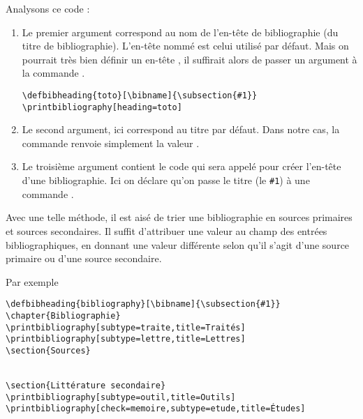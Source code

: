 Analysons ce code :
\begin{enumerate}
\item Le premier argument correspond au nom de l'en-tête de bibliographie (du titre de bibliographie). L'en-tête nommé  est celui utilisé par défaut. Mais on pourrait très bien définir un en-tête , il suffirait alors de passer un argument  à la commande .

\begin{verbatim}
\defbibheading{toto}[\bibname]{\subsection{#1}}
\printbibliography[heading=toto]
\end{verbatim}

\item Le second argument, ici  correspond au titre par défaut. Dans notre cas, la commande  renvoie simplement la valeur .
\item Le troisième argument contient le code qui sera appelé pour créer l'en-tête d'une bibliographie. Ici on déclare qu'on passe le titre (le \verb|#1|) à une commande .
\end{enumerate}


Avec une telle méthode, il est aisé de trier une bibliographie en sources primaires et sources secondaires. Il suffit d'attribuer une valeur au champ  des entrées bibliographiques, en donnant une valeur différente selon qu'il s'agit d'une source primaire ou d'une source secondaire.

Par exemple
\begin{verbatim}
\defbibheading{bibliography}[\bibname]{\subsection{#1}}
\chapter{Bibliographie}
\printbibliography[subtype=traite,title=Traités]
\printbibliography[subtype=lettre,title=Lettres]
\section{Sources}


\section{Littérature secondaire}
\printbibliography[subtype=outil,title=Outils]
\printbibliography[check=memoire,subtype=etude,title=Études]

\end{verbatim}


